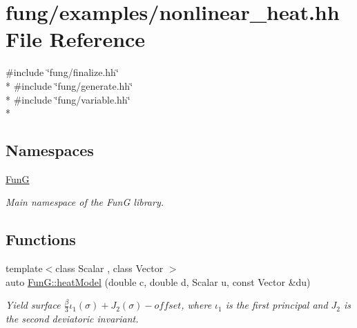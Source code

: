 \hypertarget{nonlinear__heat_8hh}{}\section{fung/examples/nonlinear\+\_\+heat.hh File Reference}
\label{nonlinear__heat_8hh}
{\ttfamily \#include \char`\"{}fung/finalize.\+hh\char`\"{}}\\*
{\ttfamily \#include \char`\"{}fung/generate.\+hh\char`\"{}}\\*
{\ttfamily \#include \char`\"{}fung/variable.\+hh\char`\"{}}\\*
\subsection*{Namespaces}
\begin{DoxyCompactItemize}
\item 
 \hyperlink{namespaceFunG}{Fun\+G}
\begin{DoxyCompactList}\small\item\em Main namespace of the Fun\+G library. \end{DoxyCompactList}\end{DoxyCompactItemize}
\subsection*{Functions}
\begin{DoxyCompactItemize}
\item 
{\footnotesize template$<$class Scalar , class Vector $>$ }\\auto \hyperlink{namespaceFunG_aab17a1468e61f58564333b3fcd7900d6}{Fun\+G\+::heat\+Model} (double c, double d, Scalar u, const Vector \&du)
\begin{DoxyCompactList}\small\item\em Yield surface $ \frac{\beta}{3}\iota_1(\sigma) + J_2(\sigma)-offset $, where $\iota_1$ is the first principal and $J_2$ is the second deviatoric invariant. \end{DoxyCompactList}\end{DoxyCompactItemize}
